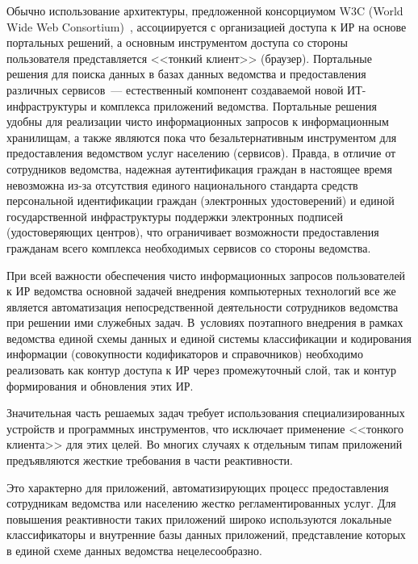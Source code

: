 \begin{multicols}{2}
      Обычно использование архитектуры, предложенной консорциумом W3C (World Wide Web Consortium)~\cite{2il}, 
ассоциируется с организацией доступа к ИР на основе портальных решений, а основным 
инструментом доступа со стороны пользователя представляется <<тонкий клиент>> (браузер). 
Портальные решения для поиска данных в базах\linebreak
 данных ведомства и предоставления 
различных сервисов~--- естественный компонент создаваемой новой ИТ-ин\-фра\-струк\-ту\-ры и 
комплекса приложений ведомства. Портальные решения удобны для реализации чисто 
информационных запросов к информационным хранилищам, а также являются пока что 
безальтернативным инструментом для предоставления ведомством услуг населению 
(сервисов).\linebreak
 Правда, в отличие от сотрудников ведомства, надежная аутентификация граждан в 
настоящее время невозможна из-за отсутствия единого национального стандарта средств 
персональной\linebreak
 идентификации граждан (электронных удостоверений) и единой 
государственной инфраструктуры поддержки электронных подписей (удосто\-ве\-ря\-ющих 
центров), что ограничивает возможности предос\-тав\-ле\-ния гражданам всего комплекса 
необходимых сервисов со стороны ведомства. 
      
      При всей важности обеспечения чисто информационных запросов пользователей к ИР 
ведомства основной задачей внедрения компьютерных технологий все же является 
автоматизация непосредственной деятельности сотрудников ведомства при решении ими 
служебных задач. В~условиях поэтапного внедрения в рамках ведомства единой схемы 
данных и единой системы классификации и кодирования информации (совокупности 
кодификаторов и справочников) необходимо реализовать как контур доступа к 
ИР через промежуточный слой, так и контур формирования и 
обновления этих ИР.
      
      Значительная часть решаемых задач требует использования специализированных 
устройств и программных инструментов, что исключает применение <<тонкого клиента>> для 
этих целей. Во многих случаях к отдельным типам приложений предъявляются жесткие 
требования в части ре\-ак\-тив\-ности. 
      
      Это характерно для приложений, автоматизирующих процесс предоставления 
сотрудникам ведомства или населению жестко регламентированных услуг. Для повышения 
реактивности таких приложений широко используются локальные классификаторы и 
внутренние базы данных приложений, представление которых в единой схеме данных 
ведомства нецелесообразно.
      

\end{multicols}
